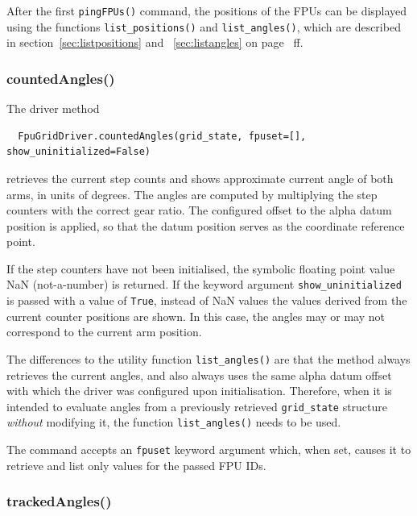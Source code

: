 \documentclass[11pt,a4paper]{scrartcl}
\begin{document}
After the first \texttt{pingFPUs()} command, the positions of the FPUs
can be displayed using the functions \texttt{list\_positions()} and
\texttt{list\_angles()}, which are described in
section~\ref{sec:listpositions} and ~\ref{sec:listangles} on
page~\pageref{sec:listpositions} ff.


\subsubsection{countedAngles()}
\label{sec:countedangles}

The driver method

\begin{verbatim}
  FpuGridDriver.countedAngles(grid_state, fpuset=[], show_uninitialized=False)
\end{verbatim}
retrieves the current step counts and shows approximate current angle
of both arms, in units of degrees. The angles are computed by
multiplying the step counters with the correct gear ratio. The
configured offset to the alpha datum position is applied, so that the
datum position serves as the coordinate reference point.

If the step counters have not been initialised, the symbolic floating
point value NaN (not-a-number) is returned.  If the keyword argument
\texttt{show\_uninitialized} is passed with a value of \texttt{True},
instead of NaN values the values derived from the current counter
positions are shown. In this case, the angles may or may not
correspond to the current arm position.

The differences to the utility function \texttt{list\_angles()} are
that the method always retrieves the current angles, and also always
uses the same alpha datum offset with which the driver was configured
upon initialisation. Therefore, when it is intended to evaluate angles
from a previously retrieved \texttt{grid\_state} structure
\emph{without} modifying it, the function \texttt{list\_angles()}
needs to be used.

The command accepts an \texttt{fpuset} keyword argument which, when
set, causes it to retrieve and list only values for the passed FPU
IDs.


\subsubsection{trackedAngles()}
\label{sec:trackedangles}
\end{document}
